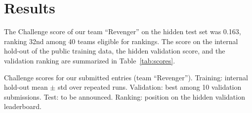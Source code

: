 \section{Results}
\label{sec:results}


The Challenge score of our team ``Revenger'' on the hidden test set was 0.163, ranking 32nd among 40 teams eligible for rankings. The score on the internal hold-out of the public training data, the hidden validation score, and the validation ranking are summarized in Table~\ref{tab:scores}.

\begin{table}[!htp]
\centering
% 

\caption{Challenge scores for our submitted entries (team ``Revenger''). Training: internal hold-out mean $\pm$ std over repeated runs. Validation: best among 10 validation submissions. Test: to be announced. Ranking: position on the hidden validation leaderboard.}
\label{tab:scores}
\end{table}
